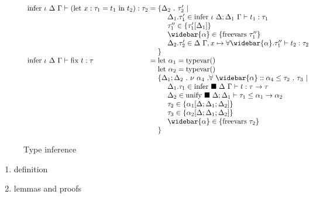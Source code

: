 \documentclass[manuscript]{acmart}
\begin{document}
\begin{figure*}[h]
\[\begin{array}{l @{} l}
      \text{infer } \iota\ \Delta\ \Gamma \vdash 
      (\text{let}\ x : \tau_1 = t_1 \text{ in } t_2) : \tau_2
      &{} =
      \begin{array}[t]{@{} l}
        \{ \Delta_2\ .\ \tau_2' \ |\ 
        \\
        \ \ \ \ \Delta_1.\tau_1' \in \text{infer } \iota\ \Delta;\Delta_1\ \Gamma \vdash t_1 : \tau_1
        \\ 
        \ \ \ \ \tau_1'' \in \{\tau_1'[\Delta_1]\}
        \\ 
        \ \ \ \ \widebar{\alpha} \in \{\text{freevars}\ \tau_1''\}
        \\ 
        \ \ \ \ \Delta_2.\tau_2' \in \Delta\ \Gamma,x \mapsto \forall \widebar{\alpha} . \tau_1''
          \vdash t_2 : \tau_2 
        \\
        \} 
      \end{array}
      \\

      \text{infer } \iota\ \Delta\ \Gamma \vdash 
      \text{fix } t : \tau      
      &{} =
      \begin{array}[t]{@{} l}
        \text{let } \alpha_1 = \text{typevar}()
        \\
        \text{let } \alpha_2 = \text{typevar}()
        \\
        \{ \Delta_1;\Delta_2\ .\ \nu\ \alpha_4 \ . \forall\ \widebar{\alpha} ::
          \alpha_4 \leq \tau_2\ .\ \tau_3
          \ |\ 
        \\
        \ \ \ \ \Delta_1.\tau_1 \in
        \text{infer } \blacksquare\ \Delta\ \Gamma \vdash t : \tau \rightarrow \tau
        \\
        \ \ \ \ \Delta_2 \in \text{unify } \blacksquare\ \Delta;\Delta_1 \vdash 
        \tau_1 \leq \alpha_1 \rightarrow \alpha_2 
        \\
        \ \ \ \ \tau_2 \in \{\alpha_1[\Delta;\Delta_1;\Delta_2]\}
        \\ 
        \ \ \ \ \tau_3 \in \{\alpha_2[\Delta;\Delta_1;\Delta_2]\} 
        \\
        \ \ \ \ \widebar{\alpha} \in \{ \text{freevars}\ \tau_2 \}
        \\
        \} 
      \end{array}
    \end{array}
  \]
  \caption{Type inference}
\end{figure*}


\begin{enumerate}
  \item definition 
  \item lemmas and proofs 
\end{enumerate}
\end{document}
